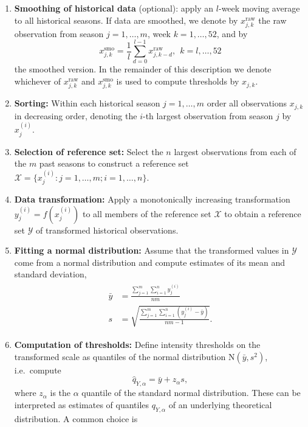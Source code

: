 \documentclass{article}
\newcommand{\sd}{s}
\begin{document}
\begin{enumerate}
\item \textbf{Smoothing of historical data} (optional): apply an $l$-week moving average to all historical seasons. If data are smoothed, we denote by $x^\text{raw}_{j, k}$ the raw observation from season $j = 1, \dots, m$, week $k = 1, \dots, 52$, and by
$$
x^\text{smo}_{j, k} = \frac{1}{l} \sum_{d = 0}^{l - 1} x^\text{raw}_{j, k - d}, \ \ k = l, \dots, 52
$$ the smoothed version. In the remainder of this description we denote whichever of $x^\text{raw}_{j, k}$ and $x^\text{smo}_{j, k}$ is used to compute thresholds by $x_{j, k}$.
\item \textbf{Sorting:} Within each historical season $j = 1, \dots, m$ order all observations $x_{j, k}$ in decreasing order, denoting the $i$-th largest observation from season $j$ by $x^{(i)}_j$.
\item \textbf{Selection of reference set:} Select the $n$ largest observations from each of the $m$ past seasons to construct a reference set $\mathcal{X} = \{x_j^{(i)}: j = 1, \dots, m; i = 1, \dots, n\}$.
\item \textbf{Data transformation:} Apply a monotonically increasing transformation $y_j^{(i)} = f(x_j^{(i)})$ to all members of the reference set $\mathcal{X}$ to obtain a reference set $\mathcal{Y}$ of transformed historical observations.
\item \textbf{Fitting a normal distribution:} Assume that the transformed values in $\mathcal{Y}$ come from a normal distribution and compute estimates of its mean and standard deviation,
\begin{align}
\begin{split}
\bar{y} & = \frac{\sum_{j = 1}^m\sum_{i = 1}^n y_j^{(i)}}{nm}\\
\sd & = \sqrt{ \frac{\sum_{j = 1}^m\sum_{i = 1}^n (y_j^{(i)}  - \bar{y})}{nm - 1}}.
\end{split}\label{eq:moments}
\end{align}
\item \textbf{Computation of thresholds:} Define intensity thresholds on the transformed scale as quantiles of the normal distribution N$(\bar{y}, \sd^2)$, i.e.\ compute
\begin{equation}
\hat{q}_{Y, \alpha} = \bar{y} + z_\alpha \sd, \label{eq:def_q}
\end{equation}
where $z_\alpha$ is the $\alpha$ quantile of the standard normal distribution. These can be interpreted as estimates of quantiles $q_{Y, \alpha}$ of an underlying theoretical distribution. A common choice is

\end{enumerate}
\end{document}
